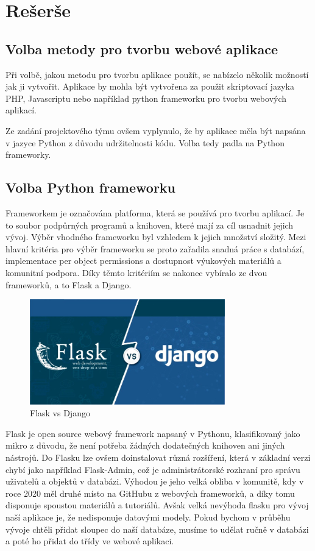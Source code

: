 \chapter{Rešerše}
\label{1-reserse}

\section{Volba metody pro tvorbu webové aplikace}

Při volbě, jakou metodu pro tvorbu aplikace použít, se nabízelo několik 
možností jak ji vytvořit. Aplikace by mohla být vytvořena za použit 
skriptovací jazyka PHP, Javascriptu nebo například python frameworku 
pro tvorbu webových aplikací. 

Ze zadání projektového týmu ovšem vyplynulo, že by aplikace měla být 
napsána v jazyce Python z důvodu udržitelnosti kódu. Volba tedy padla 
na Python frameworky.

\section{Volba Python frameworku}
Frameworkem je označována platforma, která se používá pro tvorbu aplikací. 
Je to soubor podpůrných programů a knihoven, které mají za cíl usnadnit 
jejich vývoj. Výběr vhodného frameworku byl vzhledem k jejich množství 
složitý. Mezi hlavní kritéria pro výběr frameworku se proto zařadila snadná 
práce s databází, implementace per object permissions a dostupnost 
výukových materiálů a komunitní podpora. Díky těmto kritériím se nakonec 
vybíralo ze dvou frameworků, a to Flask a Django.

\begin{figure}[H] \centering
    \includegraphics[width=240pt]{./pictures/1-django-vs-flask.jpeg}
    \caption[Flask vs Django]{Flask vs Django \cite{}}
	\label{fig:Flask vs Django}                                
\end{figure}

Flask je open source webový framework napsaný v Pythonu, klasifikovaný
jako mikro z důvodu, že není potřeba žádných dodatečných knihoven ani
jiných nástrojů. Do Flasku lze ovšem doinstalovat různá rozšíření,
která v základní verzi chybí jako například Flask-Admin, což je
administrátorské rozhraní pro správu uživatelů a objektů v
databázi. Výhodou je jeho velká obliba v komunitě, kdy v roce 2020 měl
druhé místo na GitHubu z webových frameworků, a díky tomu disponuje
spoustou materiálů a tutoriálů. Avšak velká nevýhoda flasku pro vývoj
naší aplikace je, že nedisponuje datovými modely. Pokud bychom v průběhu
vývoje chtěli přidat sloupec do naší databáze, musíme to udělat ručně
v databázi a poté ho přidat do třídy ve webové aplikaci.

